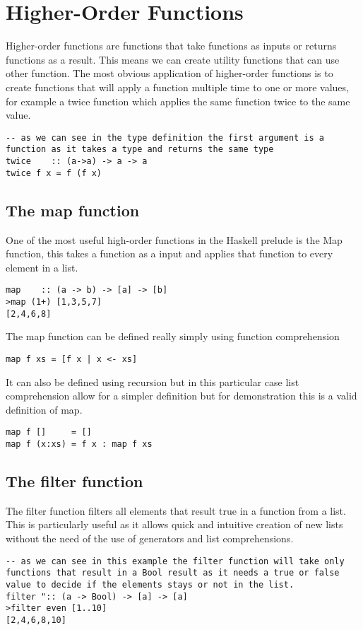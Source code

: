\documentclass[12pt, oneside]{article}
\begin{document}
\section{Higher-Order Functions}
Higher-order functions are functions that take functions as inputs or returns functions as a result. This means we can create utility functions that can use other function. The most obvious application of higher-order functions is to create functions that will apply a function multiple time to one or more values, for example a twice function which applies the same function twice to the same value. 
\begin{lstlisting}
-- as we can see in the type definition the first argument is a function as it takes a type and returns the same type
twice    :: (a->a) -> a -> a
twice f x = f (f x)
\end{lstlisting}

\subsection{The map function}
One of the most useful high-order functions in the Haskell prelude is the Map function, this takes a function as a input and applies that function to every element in a list.
\begin{lstlisting}
map    :: (a -> b) -> [a] -> [b]
>map (1+) [1,3,5,7]
[2,4,6,8]
\end{lstlisting}
The map function can be defined really simply using function comprehension 
\begin{lstlisting}
map f xs = [f x | x <- xs]
\end{lstlisting}
It can also be defined using recursion but in this particular case list comprehension allow for a simpler definition but for demonstration this is a valid definition of map.
\begin{lstlisting}
map f []     = []
map f (x:xs) = f x : map f xs
\end{lstlisting}

\subsection{The filter function}
The filter function filters all elements that result true in a function from a list. This is particularly useful as it allows quick and intuitive creation of new lists without the need of the use of generators and list comprehensions.
\begin{lstlisting}
-- as we can see in this example the filter function will take only functions that result in a Bool result as it needs a true or false value to decide if the elements stays or not in the list.
filter ":: (a -> Bool) -> [a] -> [a]
>filter even [1..10]
[2,4,6,8,10]
\end{lstlisting}
\end{document}
